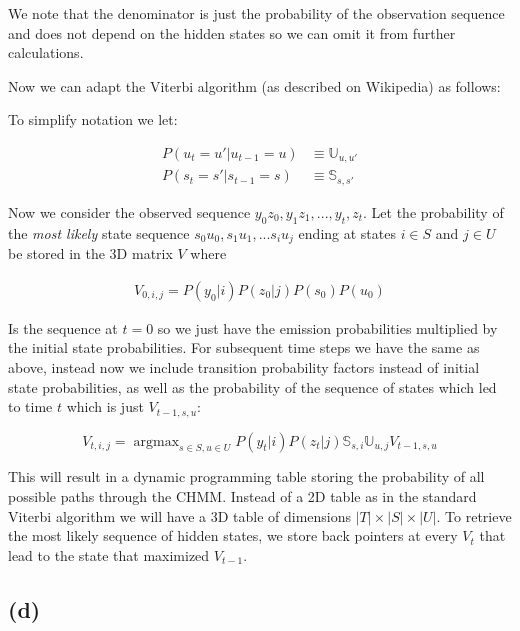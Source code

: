\documentclass[11pt]{amsart}
\DeclareMathOperator*{\argmax}{argmax}
\begin{document}
We note that the denominator is just the probability of the observation sequence and does not depend on the hidden states so we can omit it from further calculations. 

Now we can adapt the Viterbi algorithm (as described on Wikipedia) as follows:

To simplify notation we let:

\begin{equation}
\begin{aligned}
P(u_t=u' \vert u_{t-1} = u) &\equiv \mathbb{U}_{u, u'}\\
P(s_t=s' \vert s_{t-1} = s) &\equiv \mathbb{S}_{s, s'}
\end{aligned}
\end{equation}

Now we consider the observed sequence $y_0z_0, y_1z_1, ..., y_t, z_t$. Let the probability of the {\it most likely} state sequence $s_0u_0, s_1u_1, ... s_iu_j$ ending at states $i \in S$ and $j \in U$ be stored in the 3D matrix $V$ where

\begin{equation}
\begin{aligned}
V_{0, i, j} = P(y_0 \vert i) P(z_0 \vert j) P(s_0) P(u_0)
\end{aligned}
\end{equation}

Is the sequence at $t=0$ so we just have the emission probabilities multiplied by the initial state probabilities. For subsequent time steps we have the same as above, instead now we include transition probability factors instead of initial state probabilities, as well as the probability of the sequence of states which led to time $t$ which is just $V_{t-1, s, u}$:

\begin{equation}
V_{t, i, j} = \argmax_{s \in S, u \in U} P(y_t \vert i) P(z_t \vert j) \mathbb{S}_{s, i} \mathbb{U}_{u, j} V_{t-1, s, u}
\end{equation}

This will result in a dynamic programming table storing the probability of all possible paths through the CHMM. Instead of a 2D table as in the standard Viterbi algorithm we will have a 3D table of dimensions $|T| \times |S| \times |U|$. To retrieve the most likely sequence of hidden states, we store back pointers at every $V_t$ that lead to the state that maximized $V_{t-1}$. 

\subsection{(d)}
\end{document}
